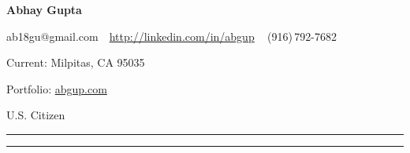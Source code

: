 \documentclass[letterpaper,10pt,oneside]{article}
\newcommand{\CVWebpage}{http://linkedin.com/in/abgup}
\newcommand{\CVWeb}{abgup.com}
\newcommand{\CVWebg}{http://abgup.com}
\begin{document}

{
\fontsize{35}{60}
\textbf{       Abhay Gupta}
}

\begin{subtitle}
\vspace{-11ex}
{{ab18gu@gmail.com}}
\,\SubBulletSymbol\,
\href{\CVWebpage}
{\CVWebpage}
\,\SubBulletSymbol\,
\,(916)\,792-7682
\par{Current: \color{cblue} Milpitas, CA 95035}
\par{Portfolio: \color{cblue} \href{\CVWebg}{\CVWeb}{}}
\par{U.S. Citizen}

\end{subtitle}

\vspace{-3ex}
{\hspace{0.07in}\noindent\color{dblue}\rule{7.1in}{0.4pt}}

\vspace{-3ex}
{\hspace{0.07in}\noindent\color{dblue}\rule{7.1in}{0.4pt}}
\end{document}
